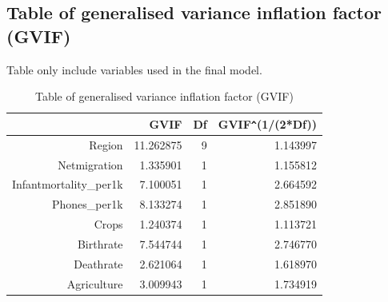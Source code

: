 \documentclass[12pt,a4paper]{article}
\begin{document}
\subsection{Table of generalised variance inflation factor (GVIF)}
Table only include variables used in the final model.

\hfill

\begin{table}[ht]
\centering
\begin{tabular}{>{\ttfamily}r r r r}
  \hline
 & GVIF & Df & GVIF\verb|^|(1/(2*Df)) \\ 
  \hline
Region & 11.262875 & 9 & 1.143997 \\ 
  Netmigration & 1.335901 & 1 & 1.155812 \\ 
  Infantmortality\_per1k & 7.100051 & 1 & 2.664592 \\ 
  Phones\_per1k & 8.133274 & 1 & 2.851890 \\ 
  Crops & 1.240374 & 1 & 1.113721 \\ 
  Birthrate & 7.544744 & 1 & 2.746770 \\ 
  Deathrate & 2.621064 & 1 & 1.618970 \\ 
  Agriculture & 3.009943 & 1 & 1.734919 \\
   \hline
\end{tabular}
\caption{Table of generalised variance inflation factor (GVIF)}
\label{vif}
\end{table}
\end{document}
